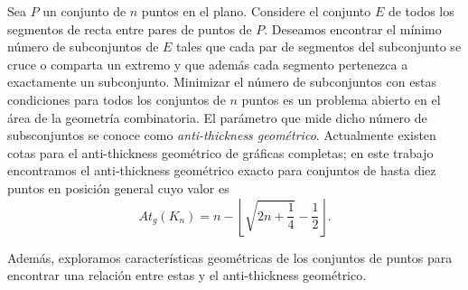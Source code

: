 Sea $P$ un conjunto de $n$ puntos en el plano. Considere el conjunto $E$ de todos los segmentos de recta
entre pares de puntos de $P$. Deseamos encontrar el mínimo número de subconjuntos de $E$ tales que cada par
de segmentos del subconjunto se cruce o comparta un extremo y que además cada segmento pertenezca a
exactamente un subconjunto. Minimizar el número de subconjuntos con estas condiciones para todos los
conjuntos de $n$ puntos es un problema abierto en el área de la geometría combinatoria. El parámetro que
mide dicho número de subsconjuntos se conoce como \emph{anti-thickness geométrico}. Actualmente existen
cotas para el anti-thickness geométrico de gráficas completas; en este trabajo encontramos el anti-thickness
geométrico exacto para conjuntos de hasta diez puntos en posición general cuyo valor es \[At_g(K_n) =n - \left\lfloor \sqrt{2n +\frac{1}{4}} - \frac{1}{2}\right\rfloor.\]

Además, exploramos características geométricas de los conjuntos de puntos para encontrar una relación entre estas y el anti-thickness geométrico.
